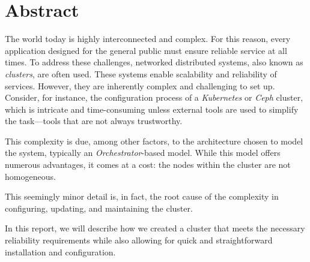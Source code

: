 
\section{Abstract}
The world today is highly interconnected and complex. For this reason, every application 
designed for the general public must ensure reliable service at all times. To address 
these challenges, networked distributed systems, also known as \textit{clusters}, are 
often used. These systems enable scalability and reliability of services. However, they 
are inherently complex and challenging to set up. Consider, for instance, the configuration 
process of a \textit{Kubernetes} or \textit{Ceph} cluster, which is intricate and 
time-consuming unless external tools are used to simplify the task—tools that are not always 
trustworthy.  

This complexity is due, among other factors, to the architecture chosen to model the system, 
typically an \textit{Orchestrator}-based model. While this model offers numerous advantages, 
it comes at a cost: the nodes within the cluster are not homogeneous.  

This seemingly minor detail is, in fact, the root cause of the complexity in configuring, 
updating, and maintaining the cluster.  

In this report, we will describe how we created a cluster that meets the necessary reliability 
requirements while also allowing for quick and straightforward installation and configuration.
